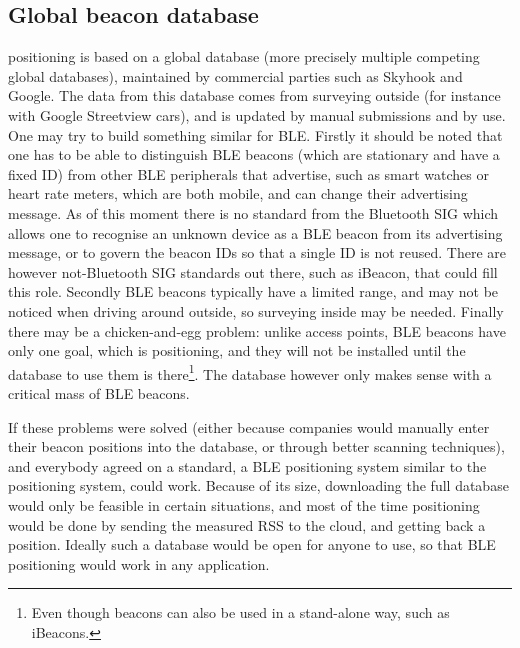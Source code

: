 \subsection{Global beacon database}
\Wifi positioning is based on a global database (more precisely multiple competing global databases), maintained by commercial parties such as Skyhook and Google.
The data from this database comes from surveying outside (for instance with Google Streetview cars), and is updated by manual submissions and by use.
One may try to build something similar for BLE.
Firstly it should be noted that one has to be able to distinguish BLE beacons (which are stationary and have a fixed ID) from other BLE peripherals that advertise, such as smart watches or heart rate meters, which are both mobile, and can change their advertising message.
As of this moment there is no standard from the Bluetooth SIG which allows one to recognise an unknown device as a BLE beacon from its advertising message, or to govern the beacon IDs so that a single ID is not reused.
There are however not-Bluetooth SIG standards out there, such as iBeacon, that could fill this role.
Secondly BLE beacons typically have a limited range, and may not be noticed when driving around outside, so surveying inside may be needed.
Finally there may be a chicken-and-egg problem: unlike \wifi access points, BLE beacons have only one goal, which is positioning, and they will not be installed until the database to use them is there\footnote{Even though beacons can also be used in a stand-alone way, such as iBeacons.}.
The database however only makes sense with a critical mass of BLE beacons.

If these problems were solved (either because companies would manually enter their beacon positions into the database, or through better scanning techniques), and everybody agreed on a standard, a BLE positioning system similar to the \wifi positioning system, could work.
Because of its size, downloading the full database would only be feasible in certain situations, and most of the time positioning would be done by sending the measured RSS to the cloud, and getting back a position.
Ideally such a database would be open for anyone to use, so that BLE positioning would work in any application.

